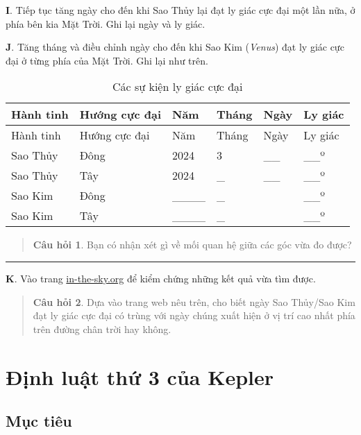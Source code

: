 \documentclass[
]{book}
\begin{document}
\textbf{I}. Tiếp tục tăng ngày cho đến khi Sao Thủy lại đạt ly giác cực đại một lần nữa, ở phía bên kia Mặt Trời. Ghi lại ngày và ly giác.

\textbf{J}. Tăng tháng và điều chỉnh ngày cho đến khi Sao Kim (\emph{Venus}) đạt ly giác cực đại ở từng phía của Mặt Trời. Ghi lại như trên.

\begin{longtable}[]{@{}llllll@{}}
\caption{\label{tab:elongation} Các sự kiện ly giác cực đại}\tabularnewline
\toprule\noalign{}
Hành tinh & Hướng cực đại & Năm & Tháng & Ngày & Ly giác \\
\midrule\noalign{}
\endfirsthead
\toprule\noalign{}
Hành tinh & Hướng cực đại & Năm & Tháng & Ngày & Ly giác \\
\midrule\noalign{}
\endhead
\bottomrule\noalign{}
\endlastfoot
Sao Thủy & Đông & 2024 & 3 & \_\_ & \_\_º \\
Sao Thủy & Tây & 2024 & \_ & \_\_ & \_\_º \\
Sao Kim & Đông & \_\_\_\_ & \_ & & \_\_º \\
Sao Kim & Tây & \_\_\_\_ & \_ & & \_\_º \\
\end{longtable}

\begin{quote}
\textbf{Câu hỏi 1}. Bạn có nhận xét gì về mối quan hệ giữa các góc vừa đo được?
\end{quote}

\begin{center}\rule{0.5\linewidth}{0.5pt}\end{center}

\textbf{K}. Vào trang \href{https://in-the-sky.org/newsindex.php?feed=innerplanets&year=2024&month=3&day=10&town=1568574}{in-the-sky.org} để kiểm chứng những kết quả vừa tìm được.

\begin{quote}
\textbf{Câu hỏi 2}. Dựa vào trang web nêu trên, cho biết ngày Sao Thủy/Sao Kim đạt ly giác cực đại có trùng với ngày chúng xuất hiện ở vị trí cao nhất phía trên đường chân trời hay không.
\end{quote}

\chapter{Định luật thứ 3 của Kepler}\label{ux111ux1ecbnh-luux1eadt-thux1ee9-3-cux1ee7a-kepler}

\section{Mục tiêu}\label{mux1ee5c-tiuxeau-2}
\end{document}
